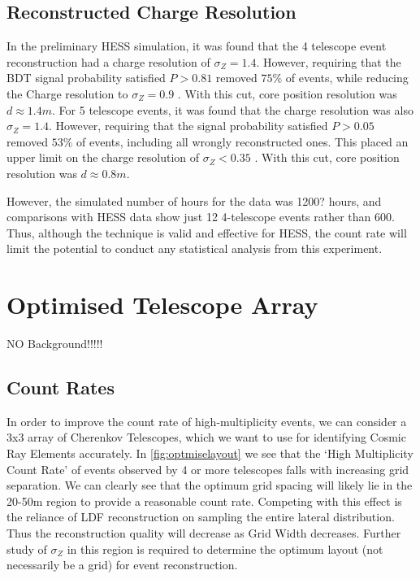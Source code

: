 \documentclass{article}
\begin{document}
\subsection{Reconstructed Charge Resolution}
In the preliminary HESS simulation, it was found that the 4 telescope event reconstruction had a charge resolution of $\sigma_{Z} = 1.4$. However, requiring that the BDT signal probability satisfied $P > 0.81$ removed $75 \%$ of events, while reducing the Charge resolution to $\sigma_{Z} = 0.9$ . With this cut, core position resolution was $d \approx 1.4 m $. For 5 telescope events, it was found that the charge resolution was also $\sigma_{Z} = 1.4$. However, requiring that the signal probability satisfied $P > 0.05$ removed $53 \%$ of events, including all wrongly reconstructed ones. This placed an upper limit on the charge resolution of $\sigma_{Z} < 0.35$ . With this cut, core position resolution was $d \approx 0.8 m $.

However, the simulated number of hours for the data was 1200? hours, and comparisons with HESS data show just 12 4-telescope events rather than 600. Thus, although the technique is valid and effective for HESS, the count rate will limit the potential to conduct any statistical analysis from this experiment.

\section{Optimised Telescope Array}
NO Background!!!!!
\subsection{Count Rates}

In order to improve the count rate of high-multiplicity events, we can consider a 3x3 array of Cherenkov Telescopes, which we want to use for identifying Cosmic Ray Elements accurately. In \ref{fig:optmiselayout} we see that the \textquoteleft High Multiplicity Count Rate' of events observed by 4 or more telescopes falls with increasing grid separation. We can clearly see that the optimum grid spacing will likely lie in the 20-50m region to provide a reasonable count rate. Competing with this effect is the reliance of LDF reconstruction on sampling the entire lateral distribution. Thus the reconstruction quality will decrease as Grid Width decreases. Further study of $\sigma_{Z}$ in this region is required to determine the optimum layout (not necessarily be a grid) for event reconstruction. 
\end{document}
